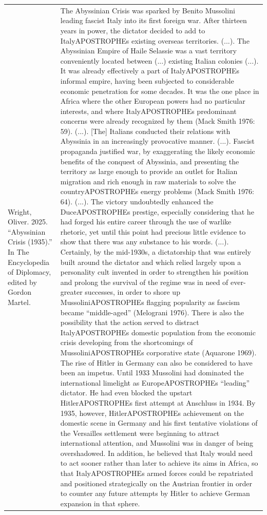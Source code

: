 {\begin{longtable}{p{}p{}}
\\
Wright, Oliver. 2025. “Abyssinian Crisis (1935).” In The Encyclopedia of Diplomacy, edited by Gordon Martel. & The Abyssinian Crisis was sparked by Benito Mussolini leading fascist Italy into its first foreign war. After thirteen years in power, the dictator decided to add to ItalyAPOSTROPHEs existing overseas territories. (...). The Abyssinian Empire of Haile Selassie was a vast territory conveniently located between (...) existing Italian colonies (...). It was already effectively a part of ItalyAPOSTROPHEs informal empire, having been subjected to considerable economic penetration for some decades. It was the one place in Africa where the other European powers had no particular interests, and where ItalyAPOSTROPHEs predominant concerns were already recognized by them (Mack Smith 1976: 59). (...). [The] Italians conducted their relations with Abyssinia in an increasingly provocative manner. (...). Fascist propaganda justified war, by exaggerating the likely economic benefits of the conquest of Abyssinia, and presenting the territory as large enough to provide an outlet for Italian migration and rich enough in raw materials to solve the countryAPOSTROPHEs energy problems (Mack Smith 1976: 64). (...). The victory undoubtedly enhanced the DuceAPOSTROPHEs prestige, especially considering that he had forged his entire career through the use of warlike rhetoric, yet until this point had precious little evidence to show that there was any substance to his words. (...). Certainly, by the mid-1930s, a dictatorship that was entirely built around the dictator and which relied largely upon a personality cult invented in order to strengthen his position and prolong the survival of the regime was in need of ever-greater successes, in order to shore up MussoliniAPOSTROPHEs flagging popularity as fascism became “middle-aged” (Melograni 1976). There is also the possibility that the action served to distract ItalyAPOSTROPHEs domestic population from the economic crisis developing from the shortcomings of MussoliniAPOSTROPHEs corporative state (Aquarone 1969). The rise of Hitler in Germany can also be considered to have been an impetus. Until 1933 Mussolini had dominated the international limelight as EuropeAPOSTROPHEs “leading” dictator. He had even blocked the upstart HitlerAPOSTROPHEs first attempt at Anschluss in 1934. By 1935, however, HitlerAPOSTROPHEs achievement on the domestic scene in Germany and his first tentative violations of the Versailles settlement were beginning to attract international attention, and Mussolini was in danger of being overshadowed. In addition, he believed that Italy would need to act sooner rather than later to achieve its aims in Africa, so that ItalyAPOSTROPHEs armed forces could be repatriated and positioned strategically on the Austrian frontier in order to counter any future attempts by Hitler to achieve German expansion in that sphere.

\end{longtable}}
